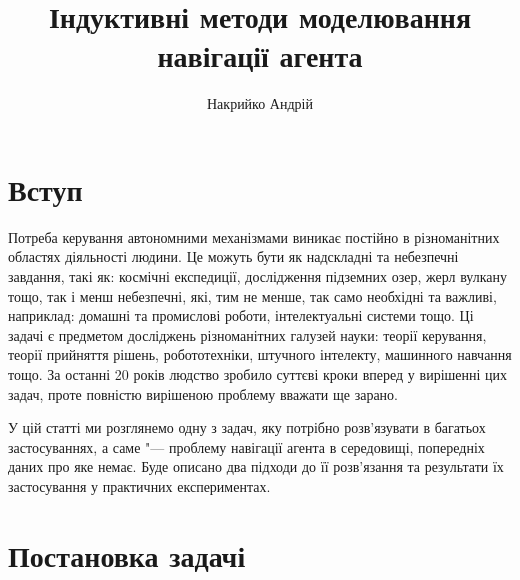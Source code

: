 \documentclass[a4paper,10pt,fleqn]{article}
\title{Індуктивні методи моделювання навігації агента}
\author{Накрийко Андрій}
\begin{document}
\maketitle

\section{Вступ}

Потреба керування автономними механізмами виникає постійно в різноманітних областях діяльності людини. Це можуть бути як надскладні та небезпечні завдання, такі як: космічні експедиції, дослідження підземних озер, жерл вулкану тощо, так і менш небезпечні, які, тим не менше, так само необхідні та важливі, наприклад: домашні та промислові роботи, інтелектуальні системи тощо. Ці задачі є предметом досліджень різноманітних галузей науки: теорії керування, теорії прийняття рішень, робототехніки, штучного інтелекту, машинного навчання тощо. За останні 20 років людство зробило суттєві кроки вперед у вирішенні цих задач, проте повністю вирішеною проблему вважати ще зарано.

У цій статті ми розглянемо одну з задач, яку потрібно розв'язувати в багатьох застосуваннях, а саме "--- проблему навігації агента в середовищі, попередніх даних про яке немає. Буде описано два підходи до її розв'язання та результати їх застосування у практичних експериментах.

\section{Постановка задачі}
\end{document}
